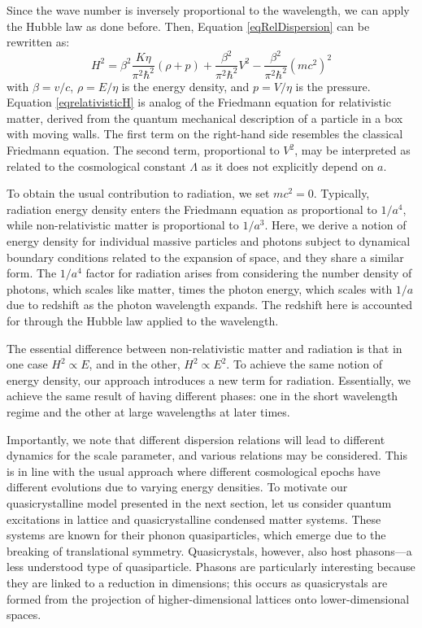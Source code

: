\documentclass{article}
\begin{document}
Since the wave number is inversely proportional to the wavelength, we can apply the Hubble law as done before.  Then, Equation \ref{eqRelDispersion} can be rewritten as:
\begin{equation}
H^{2}=\beta^{2}\frac{K\eta}{\pi^{2}\hbar^{2}}(\rho+p)+\frac{\beta^{2}}{\pi^{2}\hbar^{2}}V^{2}-\frac{\beta^{2}}{\pi^{2}\hbar^{2}}(mc^{2})^{2}\label{eqrelativisticH}
\end{equation}
with $\beta=v/c$, $\rho = E/\eta$ is the energy density, and $p = V/\eta$ is the pressure. Equation \ref{eqrelativisticH} is analog of the Friedmann equation for relativistic matter, derived from the quantum mechanical description of a particle in a box with moving walls. The first term on the right-hand side resembles the classical Friedmann equation. The second term, proportional to $V^2$, may be interpreted as related to the cosmological constant $\Lambda$ as it does not explicitly depend on $a$.


To obtain the usual contribution to radiation, we set $mc^2 = 0$. Typically, radiation energy density enters the Friedmann equation as proportional to $1/a^4$, while non-relativistic matter is proportional to $1/a^3$. Here, we derive a notion of energy density for individual massive particles and photons subject to dynamical boundary conditions related to the expansion of space, and they share a similar form. The $1/a^4$ factor for radiation arises from considering the number density of photons, which scales like matter, times the photon energy, which scales with $1/a$ due to redshift as the photon wavelength expands. The redshift here is accounted for through the Hubble law applied to the wavelength.

The essential difference between non-relativistic matter and radiation is that in one case $H^2 \propto E$, and in the other, $H^2 \propto E^2$. To achieve the same notion of energy density, our approach introduces a new term for radiation. Essentially, we achieve the same result of having different phases: one in the short wavelength regime and the other at large wavelengths at later times.

Importantly, we note that different dispersion relations will lead to different dynamics for the scale parameter, and various relations may be considered. This is in line with the usual approach where different cosmological epochs have different evolutions due to varying energy densities. To motivate our quasicrystalline model presented in the next section, let us consider quantum excitations in lattice and quasicrystalline condensed matter systems. These systems are known for their phonon quasiparticles, which emerge due to the breaking of translational symmetry. Quasicrystals, however, also host phasons—a less understood type of quasiparticle. Phasons are particularly interesting because they are linked to a reduction in dimensions; this occurs as quasicrystals are formed from the projection of higher-dimensional lattices onto lower-dimensional spaces.
\end{document}
